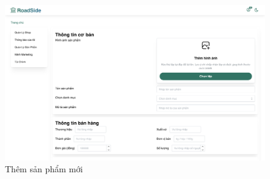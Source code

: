\begin{itemize}
        \begin{figure}[H]
            \begin{center}
            \includegraphics[width=\linewidth] {Images/UI/shop_addproduct.png}
            \end{center}
            \caption{Thêm sản phẩm mới}
        \end{figure}
\end{itemize}
